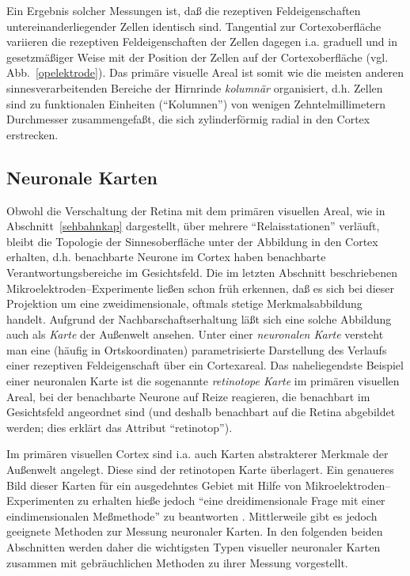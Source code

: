 Ein Ergebnis solcher Messungen ist, daß die rezeptiven Feldeigenschaften
untereinanderliegender Zellen identisch sind. Tangential zur
Cortexoberfläche variieren die rezeptiven Feldeigenschaften der Zellen
dagegen i.a. graduell und in gesetzmäßiger Weise mit der Position der
Zellen auf der Cortexoberfläche (vgl. Abb.~\ref{opelektrode}).  Das
primäre visuelle Areal ist somit wie die meisten anderen
sinnesverarbeitenden Bereiche der Hirnrinde \emph{kolumnär} organisiert,
d.h.  Zellen sind zu funktionalen Einheiten (``Kolumnen'') von wenigen
Zehntelmillimetern Durchmesser zusammengefaßt, die sich zylinderförmig
radial in den Cortex erstrecken.

\subsection{Neuronale Karten}

Obwohl die Verschaltung der Retina mit dem primären visuellen Areal, wie
in Abschnitt~\ref{sehbahnkap} dargestellt, über mehrere
``Relaisstationen'' verläuft, bleibt die Topologie der Sinnesoberfläche
unter der Abbildung in den Cortex erhalten, d.h.  benachbarte Neurone im
Cortex haben benachbarte Verantwortungsbereiche im Gesichtsfeld.  Die im
letzten Abschnitt beschriebenen Mikroelektroden--Experimente ließen schon
früh erkennen, daß es sich bei dieser Projektion um eine
zweidimensionale, oftmals stetige Merkmalsabbildung handelt.  Aufgrund der
Nachbarschaftserhaltung läßt sich eine solche Abbildung auch als
\emph{Karte} der Außenwelt ansehen.  Unter einer \emph{neuronalen Karte}
versteht man eine (häufig in Ortskoordinaten) parametrisierte Darstellung
des Verlaufs einer rezeptiven Feldeigenschaft über ein Cortexareal.  Das
naheliegendste Beispiel einer neuronalen Karte ist die sogenannte
\emph{retinotope Karte} im primären visuellen Areal, bei der benachbarte
Neurone auf Reize reagieren, die benachbart im Gesichtsfeld angeordnet sind
(und deshalb benachbart auf die Retina abgebildet werden; dies erklärt das
Attribut ``retinotop'').

Im primären visuellen Cortex sind i.a. auch Karten abstrakterer Merkmale der
\mbox{Außenwelt} angelegt. Diese sind der retinotopen Karte überlagert.
Ein genaueres Bild dieser Karten für ein ausgedehntes Gebiet mit Hilfe von
Mikroelektroden--Experimenten zu erhalten hieße jedoch ``eine
dreidimensionale Frage mit einer eindimensionalen Meßmethode'' zu
beantworten \cite{hubel:1989}.  Mittlerweile gibt es jedoch geeignete
Methoden zur Messung neuronaler Karten. In den folgenden beiden Abschnitten
werden daher die wichtigsten Typen visueller neuronaler Karten zusammen mit
gebräuchlichen Methoden zu ihrer Messung vorgestellt.

